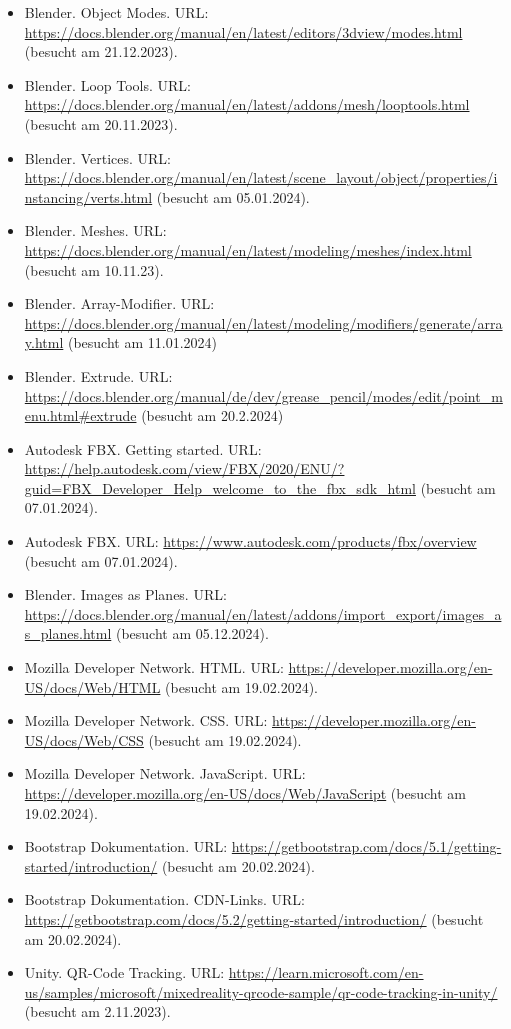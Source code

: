 \begin{itemize}
    \item Blender. Object Modes. URL: \url{https://docs.blender.org/manual/en/latest/editors/3dview/modes.html} (besucht am 21.12.2023).
    \item Blender. Loop Tools. URL: \url{https://docs.blender.org/manual/en/latest/addons/mesh/looptools.html} (besucht am 20.11.2023).
    \item Blender. Vertices. URL: \url{https://docs.blender.org/manual/en/latest/scene_layout/object/properties/instancing/verts.html} (besucht am 05.01.2024).
    \item Blender. Meshes. URL: \url{https://docs.blender.org/manual/en/latest/modeling/meshes/index.html} (besucht am 10.11.23).
    \item Blender. Array-Modifier. URL: \url{https://docs.blender.org/manual/en/latest/modeling/modifiers/generate/array.html} (besucht am 11.01.2024)
    \item Blender. Extrude. URL: \url{https://docs.blender.org/manual/de/dev/grease_pencil/modes/edit/point_menu.html#extrude} (besucht am 20.2.2024)
    \item Autodesk FBX. Getting started. URL: \url{https://help.autodesk.com/view/FBX/2020/ENU/?guid=FBX_Developer_Help_welcome_to_the_fbx_sdk_html} (besucht am 07.01.2024).
    \item Autodesk FBX. URL: \url{https://www.autodesk.com/products/fbx/overview} (besucht am 07.01.2024).
    \item Blender. Images as Planes. URL: \url{https://docs.blender.org/manual/en/latest/addons/import_export/images_as_planes.html} (besucht am 05.12.2024).
    \item Mozilla Developer Network. HTML. URL: \url{https://developer.mozilla.org/en-US/docs/Web/HTML} (besucht am 19.02.2024).
    \item Mozilla Developer Network. CSS. URL: \url{https://developer.mozilla.org/en-US/docs/Web/CSS} (besucht am 19.02.2024).
    \item Mozilla Developer Network. JavaScript. URL: \url{https://developer.mozilla.org/en-US/docs/Web/JavaScript} (besucht am 19.02.2024).
    \item Bootstrap Dokumentation. URL: \url{https://getbootstrap.com/docs/5.1/getting-started/introduction/} (besucht am 20.02.2024).
    \item Bootstrap Dokumentation. CDN-Links. URL: \url{https://getbootstrap.com/docs/5.2/getting-started/introduction/} (besucht am 20.02.2024).
    \item Unity. QR-Code Tracking. URL: \url{https://learn.microsoft.com/en-us/samples/microsoft/mixedreality-qrcode-sample/qr-code-tracking-in-unity/} (besucht am 2.11.2023).

\end{itemize}
